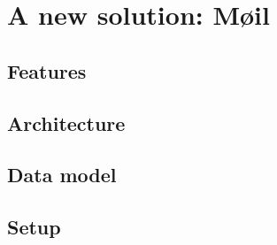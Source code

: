 \documentclass[12pt,a4paper]{scrartcl}
\begin{document}
	\section*{A new solution: Møil}

		\label{moeil-features}
		\subsection*{Features}

		\subsection*{Architecture}

		\subsection*{Data model}

		\subsection*{Setup}

	\printbibliography
\end{document}
